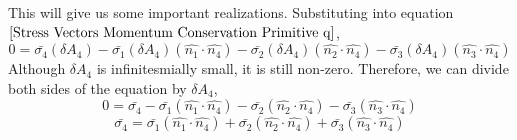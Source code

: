 This will give us some important realizations.
Substituting into equation $\ref{Stress Vectors Momentum Conservation Primitive q}$,
$$0 = \bar{\sigma_{4}}(\delta A_{4}) 
- \bar{\sigma_{1}}(\delta A_{4})(\hat{n_{1}}\cdot \hat{n_{4}})
- \bar{\sigma_{2}}(\delta A_{4})(\hat{n_{2}}\cdot \hat{n_{4}})
- \bar{\sigma_{3}}(\delta A_{4})(\hat{n_{3}}\cdot \hat{n_{4}})$$
Although $\delta A_{4}$ is infinitesmially small, it is still non-zero. 
Therefore, we can divide both sides of the equation by $\delta A_{4}$,
$$0 = \bar{\sigma_{4}} - \bar{\sigma_{1}}(\hat{n_{1}}\cdot \hat{n_{4}}) - \bar{\sigma_{2}}(\hat{n_{2}}\cdot \hat{n_{4}}) - \bar{\sigma_{3}}(\hat{n_{3}}\cdot \hat{n_{4}})$$
$$\bar{\sigma_{4}} = \bar{\sigma_{1}}(\hat{n_{1}}\cdot \hat{n_{4}}) + \bar{\sigma_{2}}(\hat{n_{2}}\cdot \hat{n_{4}}) + \bar{\sigma_{3}}(\hat{n_{3}}\cdot \hat{n_{4}})$$


